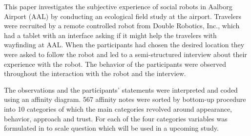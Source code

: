 \label{Abstract}
This paper investigates the subjective experience of social robots in Aalborg Airport (AAL) by conducting an ecological field study at the airport. Travelers were recruited by a remote controlled robot from Double Robotics, Inc., which had a tablet with an interface asking if it might help the travelers with wayfinding at AAL. When the participants had chosen the desired location they were asked to follow the robot and led to a semi-structured interview about their experience with the robot. The behavior of the participants were observed throughout the interaction with the robot and the interview. 

The observations and the participants' statements were interpreted and coded using an affinity diagram. 567 affinity notes were sorted by bottom-up procedure into 10 categories of which the main categories revolved around appearance, behavior, approach and trust. For each of the four categories variables was formulated in to scale question which will be used in a upcoming study. 

